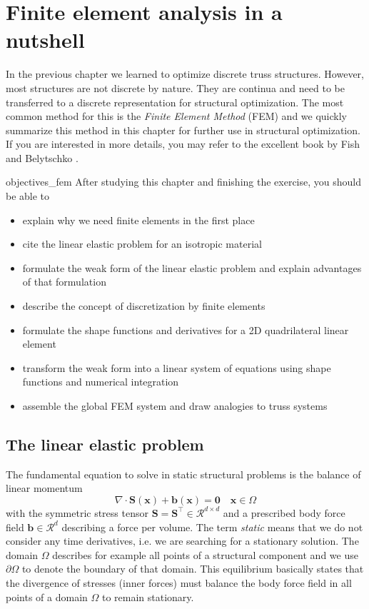 \chapter{Finite element analysis in a nutshell}
In the previous chapter we learned to optimize discrete truss structures. However, most structures are not discrete by nature. They are continua and need to be transferred to a discrete representation for structural optimization. The most common method for this is the \emph{Finite Element Method} (FEM) and we quickly summarize this method in this chapter for further use in structural optimization. If you are interested in more details, you may refer to the excellent book by Fish and Belytschko \cite{Fish2007}.

\begin{objectives}{}{objectives_fem}
After studying this chapter and finishing the exercise, you should be able to 
\begin{itemize}[label=$\dots$]
    \item explain why we need finite elements in the first place 
    \item cite the linear elastic problem for an isotropic material
    \item formulate the weak form of the linear elastic problem and explain advantages of that formulation
    \item describe the concept of discretization by finite elements 
    \item formulate the shape functions and derivatives for a 2D quadrilateral linear element 
    \item transform the weak form into a linear system of equations using shape functions and numerical integration
    \item assemble the global FEM system and draw analogies to truss systems
\end{itemize}
\end{objectives}

\section{The linear elastic problem}
The fundamental equation to solve in static structural problems is the balance of linear momentum
\begin{equation}
    \nabla \cdot \mathbf{S}(\mathbf{x}) + \mathbf{b}(\mathbf{x})= \mathbf{0} 
    \quad 
    \mathbf{x} \in \Omega
    \label{eq:linear_momentum_balance}
\end{equation}
with the symmetric stress tensor $\mathbf{S}=\mathbf{S}^\top \in \mathcal{R}^{d \times d}$ and a prescribed body force field $\mathbf{b} \in \mathcal{R}^d$ describing a force per volume. The term \emph{static} means that we do not consider any time derivatives, i.e. we are searching for a stationary solution.  The domain $\Omega$ describes for example all points of a structural component and we use $\partial \Omega$ to denote the boundary of that domain. This equilibrium basically states that the divergence of stresses (inner forces) must balance the body force field in all points of a domain $\Omega$ to remain stationary. 

